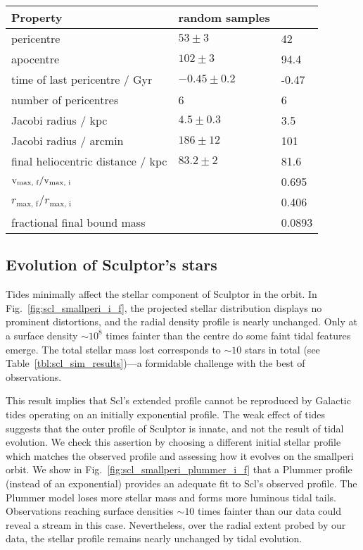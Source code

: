 \begin{table*}[t]
\centering
\caption[Simulation results for Sculptor’s dark matter]{The orbital and dark matter properties for the simulation of Sculptor. The random samples column shows the distributions from point orbits, and the \smallperi{} column contains the results from the N-body simulation. }
\label{tbl:scl_sim_results}
\begin{tabular}{lll}
\toprule
Property & random samples & \smallperi{}\\
\midrule
pericentre & $53\pm3$ & 42\\
apocentre & $102\pm3$ & 94.4\\
time of last pericentre / Gyr & $-0.45 \pm 0.2$ & -0.47\\
number of pericentres & 6 & 6\\
Jacobi radius / kpc & $4.5 \pm 0.3$ & 3.5\\
Jacobi radius / arcmin & $186\pm12$ & 101\\
final heliocentric distance / kpc & $83.2\pm2$ & 81.6\\
${\rm v}_\textrm{max, f} / {\rm v}_\textrm{max, i}$ &  & 0.695\\
$r_\textrm{max, f} / r_\textrm{max, i}$ &  & 0.406\\
fractional final bound mass &  & 0.0893\\
\bottomrule
\end{tabular}
\end{table*}

\subsection{Evolution of Sculptor's stars}\label{sec:scl_sim_stars}

Tides minimally affect the stellar component of Sculptor in the
\smallperi{} orbit. In Fig.~\ref{fig:scl_smallperi_i_f}, the projected
stellar distribution displays no prominent distortions, and the radial
density profile is nearly unchanged. Only at a surface density
\(\sim10^8\) times fainter than the centre do some faint tidal features
emerge. The total stellar mass lost corresponds to \(\sim 10\) stars in
total (see Table~\ref{tbl:scl_sim_results})---a formidable challenge
with the best of observations.

This result implies that Scl's extended profile cannot be reproduced by
Galactic tides operating on an initially exponential profile. The weak
effect of tides suggests that the outer profile of Sculptor is innate,
and not the result of tidal evolution. We check this assertion by
choosing a different initial stellar profile which matches the observed
profile and assessing how it evolves on the smallperi orbit. We show in
Fig.~\ref{fig:scl_smallperi_plummer_i_f} that a Plummer profile (instead
of an exponential) provides an adequate fit to Scl's observed profile.
The Plummer model loses more stellar mass and forms more luminous tidal
tails. Observations reaching surface densities \(\sim10\) times fainter
than our data could reveal a stream in this case. Nevertheless, over the
radial extent probed by our data, the stellar profile remains nearly
unchanged by tidal evolution.

